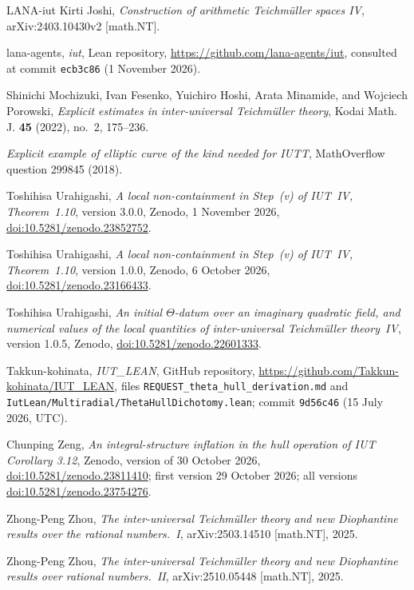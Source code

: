 \documentclass[11pt]{amsart}
\theoremstyle{remark}
\begin{document}
\begin{thebibliography}{LANA-iut}
Kirti Joshi, \emph{Construction of arithmetic {T}eichm\"uller spaces {IV}}, arXiv:2403.10430v2 [math.NT].

lana-agents, \emph{iut}, Lean repository, \url{https://github.com/lana-agents/iut}, consulted at commit
  \texttt{ecb3c86} (1 November 2026).

Shinichi Mochizuki, Ivan Fesenko, Yuichiro Hoshi, Arata Minamide, and Wojciech Porowski, \emph{Explicit estimates in
  inter-universal {T}eichm\"uller theory}, Kodai Math. J. \textbf{45} (2022), no.~2, 175--236.

\emph{Explicit example of elliptic curve of the kind needed for {IUTT}}, MathOverflow question 299845 (2018).

Toshihisa Urahigashi, \emph{A local non-containment in Step~(v) of {IUT}~{IV}, Theorem~1.10}, version 3.0.0, Zenodo,
  1 November 2026, \href{https://doi.org/10.5281/zenodo.23852752}{doi:10.5281/zenodo.23852752}.

Toshihisa Urahigashi, \emph{A local non-containment in Step~(v) of {IUT}~{IV}, Theorem~1.10}, version 1.0.0, Zenodo,
  6 October 2026, \href{https://doi.org/10.5281/zenodo.23166433}{doi:10.5281/zenodo.23166433}.

Toshihisa Urahigashi, \emph{An initial $\Theta$-datum over an imaginary quadratic field, and numerical values of the
  local quantities of inter-universal {T}eichm\"uller theory~{IV}}, version 1.0.5, Zenodo,
  \href{https://doi.org/10.5281/zenodo.22601333}{doi:10.5281/zenodo.22601333}.

Takkun-kohinata, \emph{IUT\_LEAN}, GitHub repository, \url{https://github.com/Takkun-kohinata/IUT_LEAN}, files
  \nolinkurl{REQUEST_theta_hull_derivation.md} and \nolinkurl{IutLean/Multiradial/ThetaHullDichotomy.lean}; commit
  \texttt{9d56c46} (15 July 2026, UTC).

Chunping Zeng, \emph{An integral-structure inflation in the hull operation of {IUT} {C}orollary 3.12}, Zenodo,
  version of 30 October 2026, \href{https://doi.org/10.5281/zenodo.23811410}{doi:10.5281/zenodo.23811410}; first
  version 29 October 2026; all versions \href{https://doi.org/10.5281/zenodo.23754276}{doi:10.5281/zenodo.23754276}.

Zhong-Peng Zhou, \emph{The inter-universal {T}eichm\"uller theory and new {D}iophantine results over the rational
  numbers.~{I}}, arXiv:2503.14510 [math.NT], 2025.

Zhong-Peng Zhou, \emph{The inter-universal {T}eichm\"uller theory and new {D}iophantine results over rational
  numbers.~{II}}, arXiv:2510.05448 [math.NT], 2025.

\end{thebibliography}
\end{document}
